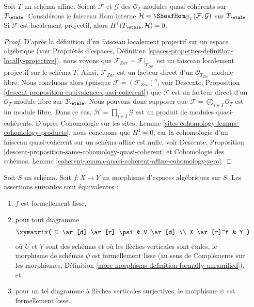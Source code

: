 \begin{lemma}
\label{lemma-h1-is-zero}
Soit $T$ un schéma affine.
Soient $\mathcal{F}$ et $\mathcal{G}$ des
$\mathcal{O}_T$-modules quasi-cohérents sur $T_\etale$.
Considérons le faisceau Hom interne
$\mathcal{H} = \SheafHom_{\mathcal{O}_T}(\mathcal{F}, \mathcal{G})$
sur $T_\etale$.
Si $\mathcal{F}$ est localement projectif, alors
$H^1(T_\etale, \mathcal{H}) = 0$.
\end{lemma}

\begin{proof}
D'après la définition d'un faisceau localement projectif sur un espace algébrique (voir
Propriétés d'espaces,
Définition \ref{spaces-properties-definition-locally-projective}),
nous voyons que $\mathcal{F}_{Zar} = \mathcal{F}|_{T_{Zar}}$ est un faisceau
localement projectif sur le schéma $T$. Ainsi, $\mathcal{F}_{Zar}$ est un
facteur direct d'un $\mathcal{O}_{T_{Zar}}$-module libre. Nous
concluons alors (puisque $\mathcal{F} = (\mathcal{F}_{Zar})^a$, voir
Descente, Proposition \ref{descent-proposition-equivalence-quasi-coherent})
que $\mathcal{F}$ est un facteur direct d'un $\mathcal{O}_T$-module libre
sur $T_\etale$. Nous pouvons donc supposer que
$\mathcal{F} = \bigoplus_{i \in I} \mathcal{O}_T$ est un module libre.
Dans ce cas, $\mathcal{H} = \prod_{i \in I} \mathcal{G}$ est
un produit de modules quasi-cohérents. D'après
Cohomologie sur les sites, Lemme \ref{sites-cohomology-lemma-cohomology-products},
nous concluons que $H^1 = 0$, car la cohomologie d'un faisceau quasi-cohérent
sur un schéma affine est nulle, voir
Descente, Proposition \ref{descent-proposition-same-cohomology-quasi-coherent}
et Cohomologie des schémas, Lemme
\ref{coherent-lemma-quasi-coherent-affine-cohomology-zero}.
\end{proof}

\begin{lemma}
\label{lemma-formally-smooth}
Soit $S$ un schéma.
Soit $f : X \to Y$ un morphisme d'espaces algébriques sur
$S$. Les assertions suivantes sont équivalentes :
\begin{enumerate}
\item $f$ est formellement lisse,
\item pour tout diagramme
$$
\xymatrix{
U \ar[d] \ar[r]_\psi & V \ar[d] \\
X \ar[r]^f & Y
}
$$
où $U$ et $V$ sont des schémas et où les flèches verticales sont étales,
le morphisme de schémas $\psi$ est formellement lisse (au sens de
Compléments sur les morphismes,
Définition \ref{more-morphisms-definition-formally-unramified}), et
\item pour un tel diagramme à flèches verticales surjectives, le morphisme
$\psi$ est formellement lisse.
\end{enumerate}
\end{lemma}

